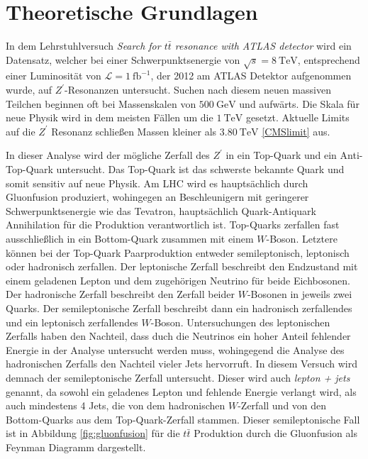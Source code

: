 \section{Theoretische Grundlagen}
\label{sec:theorie}

In dem Lehrstuhlversuch \textit{Search for $t\bar{t}$ resonance with ATLAS detector} wird ein Datensatz, welcher bei
einer Schwerpunktsenergie von $\sqrt{s} = \SI{8}{\tera\electronvolt}$, entsprechend einer Luminosität von
$\mathcal{L} = \SI{1}{\femto\barn}^{-1}$, der 2012 am ATLAS Detektor aufgenommen wurde, auf $Z^\prime$-Resonanzen untersucht.
Suchen nach diesem neuen massiven Teilchen beginnen oft bei Massenskalen von $\SI{500}{\giga\electronvolt}$ und aufwärts. Die
Skala für neue Physik wird in dem meisten Fällen um die $\SI{1}{\tera\electronvolt}$ gesetzt. Aktuelle Limits auf die
$Z^\prime$ Resonanz schließen Massen kleiner als $\SI{3.80}{\tera\electronvolt}$ \ref{CMSlimit} aus. \par

In dieser Analyse wird der mögliche Zerfall des $Z^\prime$ in ein Top-Quark und ein Anti-Top-Quark untersucht. Das Top-Quark
ist das schwerste bekannte Quark und somit sensitiv auf neue Physik. Am LHC wird es hauptsächlich durch Gluonfusion
produziert, wohingegen an Beschleunigern mit geringerer Schwerpunktsenergie wie das Tevatron, hauptsächlich Quark-Antiquark
Annihilation für die Produktion verantwortlich ist. Top-Quarks
zerfallen fast ausschließlich in ein Bottom-Quark zusammen mit einem $W$-Boson. Letztere können bei der
Top-Quark Paarproduktion entweder semileptonisch,
leptonisch oder hadronisch zerfallen. Der leptonische Zerfall beschreibt den Endzustand mit einem geladenen Lepton und
dem zugehörigen Neutrino für beide Eichbosonen. Der hadronische Zerfall beschreibt den Zerfall beider $W$-Bosonen in
jeweils zwei Quarks. Der semileptonische Zerfall beschreibt dann ein hadronisch zerfallendes und ein leptonisch
zerfallendes  $W$-Boson. Untersuchungen des leptonischen Zerfalls haben den Nachteil, dass duch die Neutrinos ein hoher Anteil fehlender
Energie in der Analyse untersucht werden muss, wohingegend die Analyse des hadronischen Zerfalls den Nachteil vieler Jets
hervorruft.
In diesem Versuch wird demnach der semileptonische Zerfall untersucht.
Dieser wird auch \textit{lepton + jets} genannt,
da sowohl ein geladenes Lepton und fehlende Energie verlangt wird, als auch mindestens 4 Jets, die von dem hadronischen $W$-Zerfall und von den Bottom-Quarks
aus dem Top-Quark-Zerfall stammen.
Dieser semileptonische Fall ist in Abbildung \ref{fig:gluonfusion} für die $t\bar{t}$ Produktion durch die Gluonfusion als Feynman Diagramm dargestellt.  \par

